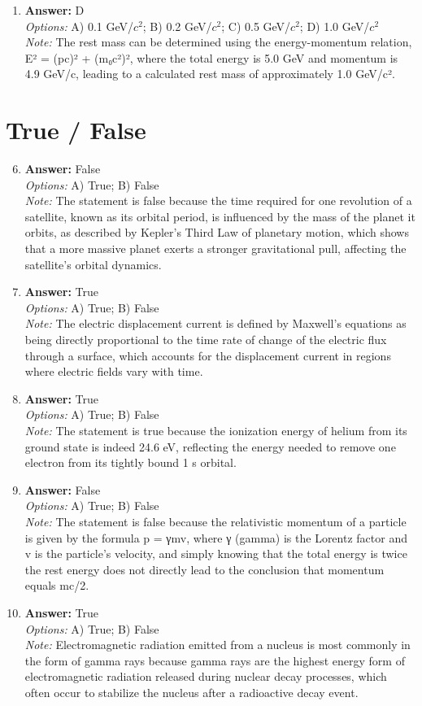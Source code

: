\documentclass[12pt]{article}
\begin{document}
\begin{enumerate}[label=\arabic*.]
\item \textbf{Answer:} D
\\ \textit{Options:} A) 0.1 GeV/$c^2$; B) 0.2 GeV/$c^2$; C) 0.5 GeV/$c^2$; D) 1.0 GeV/$c^2$
\\ \textit{Note:} The rest mass can be determined using the energy-momentum relation, E² = (pc)² + (m₀c²)², where the total energy is 5.0 GeV and momentum is 4.9 GeV/c, leading to a calculated rest mass of approximately 1.0 GeV/c².
\end{enumerate}

\section*{True / False}
\begin{enumerate}[label=\arabic*.]
\setcounter{enumi}{5}
\item \textbf{Answer:} False
\\ \textit{Options:} A) True; B) False
\\ \textit{Note:} The statement is false because the time required for one revolution of a satellite, known as its orbital period, is influenced by the mass of the planet it orbits, as described by Kepler's Third Law of planetary motion, which shows that a more massive planet exerts a stronger gravitational pull, affecting the satellite's orbital dynamics.
\item \textbf{Answer:} True
\\ \textit{Options:} A) True; B) False
\\ \textit{Note:} The electric displacement current is defined by Maxwell's equations as being directly proportional to the time rate of change of the electric flux through a surface, which accounts for the displacement current in regions where electric fields vary with time.
\item \textbf{Answer:} True
\\ \textit{Options:} A) True; B) False
\\ \textit{Note:} The statement is true because the ionization energy of helium from its ground state is indeed 24.6 eV, reflecting the energy needed to remove one electron from its tightly bound 1 s orbital.
\item \textbf{Answer:} False
\\ \textit{Options:} A) True; B) False
\\ \textit{Note:} The statement is false because the relativistic momentum of a particle is given by the formula p = γmv, where γ (gamma) is the Lorentz factor and v is the particle's velocity, and simply knowing that the total energy is twice the rest energy does not directly lead to the conclusion that momentum equals mc/2.
\item \textbf{Answer:} True
\\ \textit{Options:} A) True; B) False
\\ \textit{Note:} Electromagnetic radiation emitted from a nucleus is most commonly in the form of gamma rays because gamma rays are the highest energy form of electromagnetic radiation released during nuclear decay processes, which often occur to stabilize the nucleus after a radioactive decay event.
\end{enumerate}
\end{document}
